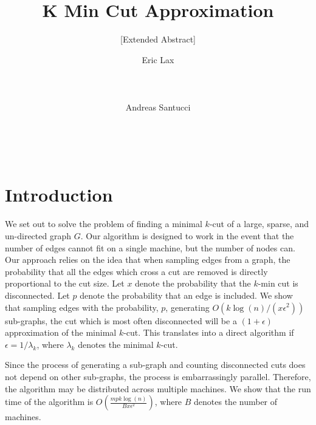 \documentclass{acm_proc_article-sp}
\begin{document}
 

\title{\textbf{K Min Cut Approximation}}
\subtitle{[Extended Abstract]}
\author{
\alignauthor
Eric Lax \\
  \\
   \\
  \\
\alignauthor
Andreas Santucci \\
   \\
   \\
   \\
}
\maketitle

\section{Introduction}
We set out to solve the problem of finding a minimal $k$-cut of a large, sparse, and un-directed graph $G$. Our algorithm is designed to work in the event that the number of edges cannot fit on a single machine, but the number of nodes can. Our approach relies on the idea that when sampling edges from a graph, the probability that all the edges which cross a cut are removed is directly proportional to the cut size. Let $x$ denote the probability that the $k$-min cut is disconnected. Let $p$ denote the probability that an edge is included. We show that sampling edges with the probability, $p$, generating $O(k \log(n)/(x\epsilon^2))$ sub-graphs, the cut which is most often disconnected will be a $(1+\epsilon)$ approximation of the minimal $k$-cut. This translates into a direct algorithm if $\epsilon = 1/\lambda_k$, where $\lambda_k$ denotes the minimal $k$-cut.

Since the process of generating a sub-graph and counting disconnected cuts does not depend on other sub-graphs, the process is embarrassingly parallel. Therefore, the algorithm may be distributed across multiple machines. We show that the run time of the algorithm is $O(\frac{mpk \log(n)}{B x \epsilon^2})$, where $B$ denotes the number of machines.
\end{document}
